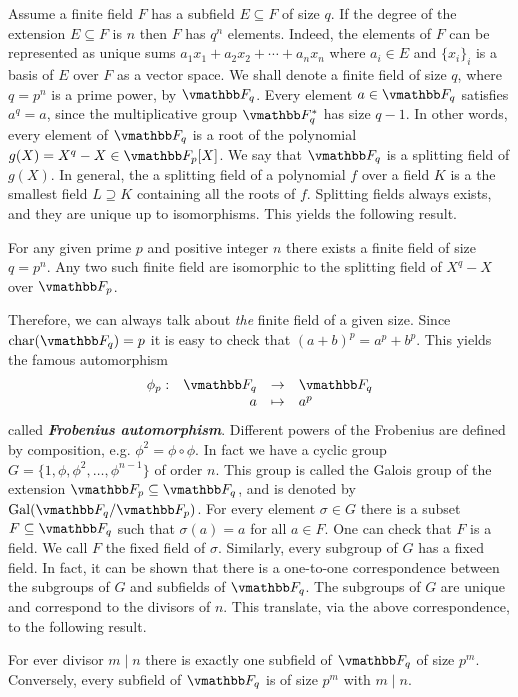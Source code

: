 Assume a finite field $F$ has a subfield $E \subseteq F$ of size $q$. If the degree of the 
extension $E \subseteq F$ is $n$ then $F$ has $q^n$ elements. Indeed, the elements of $F$ can be 
represented as unique sums $a_1x_1 + a_2x_2 + \cdots + a_nx_n$ where $a_i \in E$ and $\{x_i\}_i$ 
is a basis of $E$ over $F$ as a vector space. We shall denote a finite field of size $q$, where 
$q = p^n$ is a prime power, by $\F_q$. Every element $a \in \F_q$ satisfies $a^q = a$, since the 
multiplicative group $\F_q^*$ has size $q - 1$. In other words, every element of $\F_q$ is a root 
of the polynomial $g(X) = X^q - X \in \F_p[X]$. We say that $\F_q$ is a splitting field of $g(X)$. 
In general, the a splitting field of a polynomial $f$ over a field $K$ is a the smallest field $L 
\supseteq K$ containing all the roots of $f$. Splitting fields always exists, and they are unique 
up to isomorphisms. This yields the following result.
\begin{result}
	For any given prime $p$ and positive integer $n$ there exists a finite field of size $q = 
	p^n$. Any two such finite field are isomorphic to the splitting field of $X^q - X$ over $\F_p$.
\end{result}
Therefore, we can always talk about \textit{the} finite field of a given size. Since 
$\fieldchar(\F_q) = p$ it is easy to check that $(a + b)^p = a^p + b^p$. This yields the famous 
automorphism 
\[
	\begin{array}{lrll}
		\phi_p: & \F_q & \rightarrow & \F_q \\
		& a & \mapsto & a^p
	\end{array}
\]
called \textit{\textbf{Frobenius automorphism}}. Different powers of the Frobenius are defined by 
composition, e.g. $\phi^2 = \phi \circ \phi$. In fact we have a cyclic group $G = \{ 1, \phi, 
\phi^2, \dots, \phi^{n - 1}\}$ of order $n$. This group is called the Galois group of the 
extension $\F_p \subseteq \F_q$, and is denoted by $\gal(\F_q / \F_p)$. For every element $\sigma 
\in G$ there is a subset $F \subseteq \F_q$ such that $\sigma(a) = a$ for all $a \in F$. One can 
check that $F$ is a field. We call $F$ the fixed field of $\sigma$. Similarly, every subgroup of 
$G$ has a fixed field. In fact, it can be shown that there is a one-to-one correspondence between 
the subgroups of $G$ and subfields of $\F_q$. The subgroups of $G$ are unique and correspond to 
the divisors of $n$. This translate, via the above correspondence, to the following result.
\begin{result}
	For ever divisor $m \mid n$ there is exactly one subfield of $\F_q$ of size $p^m$. Conversely, 
	every subfield of $\F_q$ is of size $p^m$ with $m \mid n$.
\end{result}
